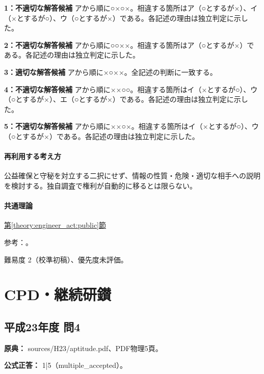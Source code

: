 \noindent\textbf{1：不適切な解答候補} アから順に○×○×。相違する箇所はア（○とするが×）、イ（×とするが○）、ウ（○とするが×）である。各記述の理由は独立判定に示した。\par

\noindent\textbf{2：不適切な解答候補} アから順に○○××。相違する箇所はア（○とするが×）である。各記述の理由は独立判定に示した。\par

\noindent\textbf{3：適切な解答候補} アから順に×○××。全記述の判断に一致する。\par

\noindent\textbf{4：不適切な解答候補} アから順に××○○。相違する箇所はイ（×とするが○）、ウ（○とするが×）、エ（○とするが×）である。各記述の理由は独立判定に示した。\par

\noindent\textbf{5：不適切な解答候補} アから順に××○×。相違する箇所はイ（×とするが○）、ウ（○とするが×）である。各記述の理由は独立判定に示した。\par

\paragraph{再利用する考え方} 公益確保と守秘を対立する二択にせず、情報の性質・危険・適切な相手への説明を検討する。独自調査で権利が自動的に移るとは限らない。

\paragraph{共通理論} \hyperref[theory:engineer_act:public]{第\ref*{theory:engineer_act:public}節}

\par 参考：\cite{engineer_act_current,cpd_v3}。

\par 難易度 2（校準初稿）、優先度未評価。

\section{CPD・継続研鑚}

\subsection{平成23年度 問4}
\label{q:h23-reg-apt-04}

\noindent\textbf{原典：} sources/H23/aptitude.pdf、PDF物理5頁。

\textbf{公式正答：} 1|5（multiple\_accepted）。

